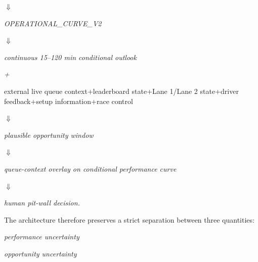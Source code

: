 \begin{center}\textit{\ensuremath{\Downarrow}}\end{center}

\begin{center}\textit{OPERATIONAL\_CURVE\_V2}\end{center}

\begin{center}\textit{\ensuremath{\Downarrow}}\end{center}

\begin{center}\textit{continuous 15--120 min conditional outlook}\end{center}

\begin{center}\textit{+}\end{center}

external live queue context+leaderboard state+Lane 1/Lane 2 state+driver feedback+setup information+race control

\begin{center}\textit{\ensuremath{\Downarrow}}\end{center}

\begin{center}\textit{plausible opportunity window}\end{center}

\begin{center}\textit{\ensuremath{\Downarrow}}\end{center}

\begin{center}\textit{queue-context overlay on conditional performance curve}\end{center}

\begin{center}\textit{\ensuremath{\Downarrow}}\end{center}

\begin{center}\textit{human pit-wall decision.}\end{center}

The architecture therefore preserves a strict separation between three quantities:

\begin{center}\textit{performance uncertainty}\end{center}

\begin{center}\textit{opportunity uncertainty}\end{center}

